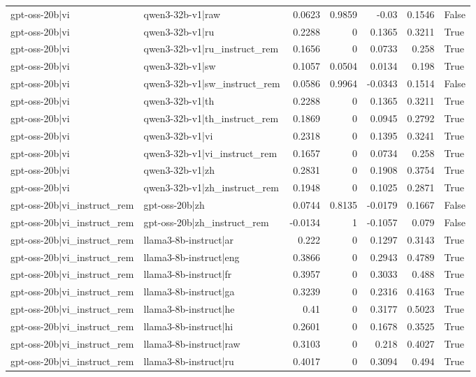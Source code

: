 \begin{table}
\begin{tabular}{l l r r r r l}
gpt-oss-20b|vi & qwen3-32b-v1|raw & 0.0623 & 0.9859 & -0.03 & 0.1546 & False \\
gpt-oss-20b|vi & qwen3-32b-v1|ru & 0.2288 & 0 & 0.1365 & 0.3211 & True \\
gpt-oss-20b|vi & qwen3-32b-v1|ru_instruct_rem & 0.1656 & 0 & 0.0733 & 0.258 & True \\
gpt-oss-20b|vi & qwen3-32b-v1|sw & 0.1057 & 0.0504 & 0.0134 & 0.198 & True \\
gpt-oss-20b|vi & qwen3-32b-v1|sw_instruct_rem & 0.0586 & 0.9964 & -0.0343 & 0.1514 & False \\
gpt-oss-20b|vi & qwen3-32b-v1|th & 0.2288 & 0 & 0.1365 & 0.3211 & True \\
gpt-oss-20b|vi & qwen3-32b-v1|th_instruct_rem & 0.1869 & 0 & 0.0945 & 0.2792 & True \\
gpt-oss-20b|vi & qwen3-32b-v1|vi & 0.2318 & 0 & 0.1395 & 0.3241 & True \\
gpt-oss-20b|vi & qwen3-32b-v1|vi_instruct_rem & 0.1657 & 0 & 0.0734 & 0.258 & True \\
gpt-oss-20b|vi & qwen3-32b-v1|zh & 0.2831 & 0 & 0.1908 & 0.3754 & True \\
gpt-oss-20b|vi & qwen3-32b-v1|zh_instruct_rem & 0.1948 & 0 & 0.1025 & 0.2871 & True \\
gpt-oss-20b|vi_instruct_rem & gpt-oss-20b|zh & 0.0744 & 0.8135 & -0.0179 & 0.1667 & False \\
gpt-oss-20b|vi_instruct_rem & gpt-oss-20b|zh_instruct_rem & -0.0134 & 1 & -0.1057 & 0.079 & False \\
gpt-oss-20b|vi_instruct_rem & llama3-8b-instruct|ar & 0.222 & 0 & 0.1297 & 0.3143 & True \\
gpt-oss-20b|vi_instruct_rem & llama3-8b-instruct|eng & 0.3866 & 0 & 0.2943 & 0.4789 & True \\
gpt-oss-20b|vi_instruct_rem & llama3-8b-instruct|fr & 0.3957 & 0 & 0.3033 & 0.488 & True \\
gpt-oss-20b|vi_instruct_rem & llama3-8b-instruct|ga & 0.3239 & 0 & 0.2316 & 0.4163 & True \\
gpt-oss-20b|vi_instruct_rem & llama3-8b-instruct|he & 0.41 & 0 & 0.3177 & 0.5023 & True \\
gpt-oss-20b|vi_instruct_rem & llama3-8b-instruct|hi & 0.2601 & 0 & 0.1678 & 0.3525 & True \\
gpt-oss-20b|vi_instruct_rem & llama3-8b-instruct|raw & 0.3103 & 0 & 0.218 & 0.4027 & True \\
gpt-oss-20b|vi_instruct_rem & llama3-8b-instruct|ru & 0.4017 & 0 & 0.3094 & 0.494 & True \\

\end{tabular}
\end{table}
